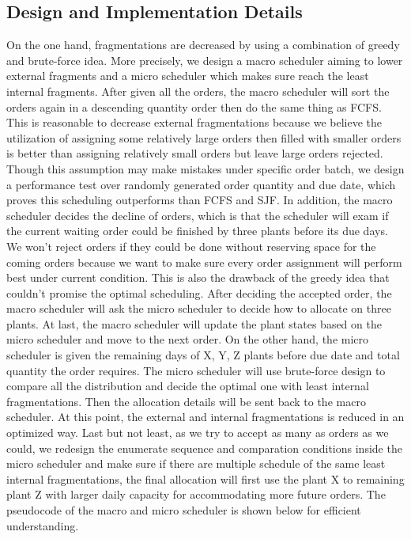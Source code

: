 \documentclass[conference]{IEEEtran}
\begin{document}
\subsection{Design and Implementation Details}
On the one hand, fragmentations are decreased by using a combination of greedy and brute-force idea. More precisely, we design a macro scheduler aiming to lower external fragments and a micro scheduler which makes sure reach the least internal fragments. After given all the orders, the macro scheduler will sort the orders again in a descending quantity order then do the same thing as FCFS. This is reasonable to decrease external fragmentations because we believe the utilization of assigning some relatively large orders then filled with smaller orders is better than assigning relatively small orders but leave large orders rejected. Though this assumption may make mistakes under specific order batch, we design a performance test over randomly generated order quantity and due date, which proves this scheduling outperforms than FCFS and SJF. In addition, the macro scheduler decides the decline of orders, which is that the scheduler will exam if the current waiting order could be finished by three plants before its due days. We won’t reject orders if they could be done without reserving space for the coming orders because we want to make sure every order assignment will perform best under current condition. This is also the drawback of the greedy idea that couldn’t promise the optimal scheduling. After deciding the accepted order, the macro scheduler will ask the micro scheduler to decide how to allocate on three plants. At last, the macro scheduler will update the plant states based on the micro scheduler and move to the next order.
On the other hand, the micro scheduler is given the remaining days of X, Y, Z plants before due date and total quantity the order requires. The micro scheduler will use brute-force design to compare all the distribution and decide the optimal one with least internal fragmentations. Then the allocation details will be sent back to the macro scheduler. At this point, the external and internal fragmentations is reduced in an optimized way.
Last but not least, as we try to accept as many as orders as we could, we redesign the enumerate sequence and comparation conditions inside the micro scheduler and make sure if there are multiple schedule of the same least internal fragmentations, the final allocation will first use the plant X to remaining plant Z with larger daily capacity for accommodating more future orders. The pseudocode of the macro and micro scheduler is shown below for efficient understanding.
\end{document}
